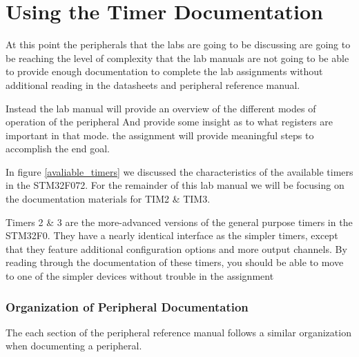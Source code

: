 \documentclass[11pt,fleqn]{book} %
\begin{document}
\section{Using the Timer Documentation}
    At this point the peripherals that the labs are going to be discussing are going to be reaching the level of complexity that the lab manuals are not going to be able to provide enough documentation to complete the lab assignments without additional reading in the datasheets and peripheral reference manual. 
    
    Instead the lab manual will provide an overview of the different modes of operation of the peripheral And provide some insight as to what registers are important in that mode. the assignment will provide meaningful steps to accomplish the end goal. 

    In figure \ref{avaliable_timers} we discussed the characteristics of the available timers in the STM32F072. For the remainder of this lab manual we will be focusing on the documentation materials for TIM2 \& TIM3. 
    
    Timers 2 \& 3 are the more-advanced versions of the general purpose timers in the STM32F0. They have a nearly identical interface as the simpler timers, except that they feature additional configuration options and more output channels. By reading through the documentation of these timers, you should be able to move to one of the simpler devices without trouble in the assignment 
    
    \subsubsection{Organization of Peripheral Documentation}
    The each section of the peripheral reference manual follows a similar organization when documenting a peripheral. 
    
    
%    
%    
\end{document}
